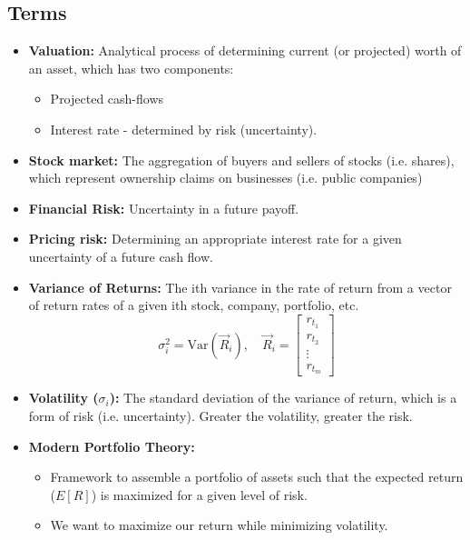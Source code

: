 \subsection{Terms}
\begin{terminology}
    \begin{itemize}
        \item \textbf{Valuation:} Analytical process of determining current (or projected) worth of an asset, which has two components:
        \begin{itemize}
            \item Projected cash-flows
            \item Interest rate - determined by risk (uncertainty).
        \end{itemize}

        \item \textbf{Stock market:} The aggregation of buyers and sellers of stocks (i.e. shares), which represent ownership claims on businesses (i.e. public companies)

        \item \textbf{Financial Risk:} Uncertainty in a future payoff.
        \item \textbf{Pricing risk:} Determining an appropriate interest rate for a given uncertainty of a future cash flow. 

        
        \item \textbf{Variance of Returns:} The ith variance in the rate of return from a vector of return rates of a given ith stock, company, portfolio, etc.
        \[
        \sigma_i^2 = \text{Var}(\vec{R}_i), \quad \vec{R}_i = \begin{bmatrix}
        r_{t_1} \\
        r_{t_2} \\
        \vdots \\
        r_{t_m}
        \end{bmatrix}
        \]
        
        \item \textbf{Volatility ($\sigma_i$):} The standard deviation of the variance of return, which is a form of risk (i.e. uncertainty). Greater the volatility, greater the risk.
        
        \item \textbf{Modern Portfolio Theory:}
        \begin{itemize}
            \item Framework to assemble a portfolio of assets such that the expected return ($E[R]$) is maximized for a given level of risk.
            \item We want to maximize our return while minimizing volatility.
        \end{itemize}
    \end{itemize}            
\end{terminology}

